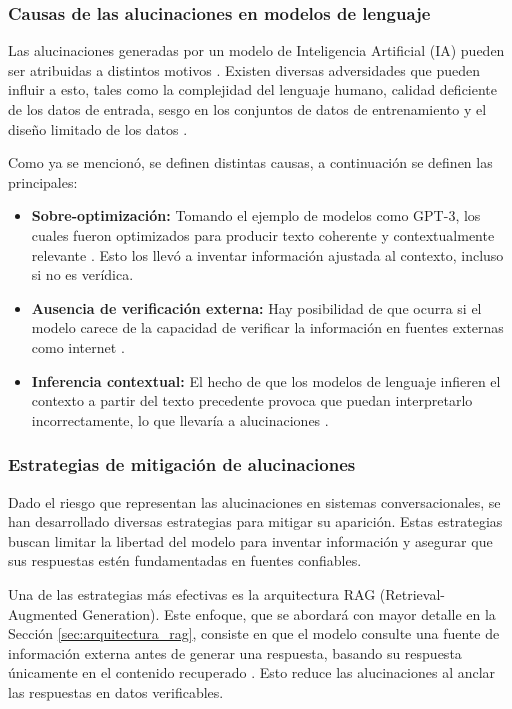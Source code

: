 \subsubsection{Causas de las alucinaciones en modelos de lenguaje}
\label{subsec:causas_alucinaciones}

Las alucinaciones generadas por un modelo de Inteligencia Artificial (IA) pueden ser atribuidas a distintos motivos \cite{navarro2025alucinaciones}. Existen diversas adversidades que pueden influir a esto, tales como la complejidad del lenguaje humano, calidad deficiente de los datos de entrada, sesgo en los conjuntos de datos de entrenamiento y el diseño limitado de los datos \cite{navarro2025alucinaciones}.

Como ya se mencionó, se definen distintas causas, a continuación se definen las principales:

\begin{itemize}
    \item \textbf{Sobre-optimización:} Tomando el ejemplo de modelos como GPT-3, los cuales fueron optimizados para producir texto coherente y contextualmente relevante \cite{navarro2025alucinaciones}. Esto los llevó a inventar información ajustada al contexto, incluso si no es verídica.
    \item \textbf{Ausencia de verificación externa:} Hay posibilidad de que ocurra si el modelo carece de la capacidad de verificar la información en fuentes externas como internet \cite{navarro2025alucinaciones}.
    \item \textbf{Inferencia contextual:} El hecho de que los modelos de lenguaje infieren el contexto a partir del texto precedente provoca que puedan interpretarlo incorrectamente, lo que llevaría a alucinaciones \cite{navarro2025alucinaciones}.
\end{itemize}

\subsubsection{Estrategias de mitigación de alucinaciones}
\label{subsec:estrategias_mitigacion}

Dado el riesgo que representan las alucinaciones en sistemas conversacionales, se han desarrollado diversas estrategias para mitigar su aparición. Estas estrategias buscan limitar la libertad del modelo para inventar información y asegurar que sus respuestas estén fundamentadas en fuentes confiables.

Una de las estrategias más efectivas es la arquitectura RAG (Retrieval-Augmented Generation). Este enfoque, que se abordará con mayor detalle en la Sección \ref{sec:arquitectura_rag}, consiste en que el modelo consulte una fuente de información externa antes de generar una respuesta, basando su respuesta únicamente en el contenido recuperado \cite{hu2025removal, yin2026mitigating}. Esto reduce las alucinaciones al anclar las respuestas en datos verificables.

